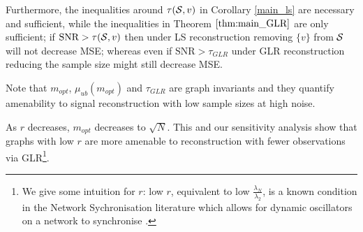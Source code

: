 {\begin{remark}
    Furthermore, the inequalities around $\tau(\mathcal{S},v)$ in Corollary \ref{main_ls} are necessary and sufficient, while the inequalities in Theorem $\ref{thm:main_GLR}$ are only sufficient; if $\textrm{SNR} > \tau(\mathcal{S},v)$ then under LS reconstruction removing $\{v\}$ from $\mathcal{S}$ will not decrease MSE; whereas even if $\textrm{SNR} > \tau_{GLR}$ under GLR reconstruction reducing the sample size might still decrease MSE.
\end{remark}
\fi

Note that $m_{opt}$, $\mu_{ub}(m_{opt})$ and $\tau_{GLR}$ are graph invariants and they quantify amenability to signal reconstruction with low sample sizes at high noise. 

As $r$ decreases, $m_{opt}$ decreases to $\sqrt{N}$. This and our sensitivity analysis show that graphs with low $r$ are more amenable to reconstruction with fewer observations via GLR\footnote{We give some intuition for $r$: low $r$, equivalent to low $\frac{\lambda_{N}}{\lambda_{2}}$, is a known condition in the Network Sychronisation literature which allows for dynamic oscillators on a network to synchronise \cite{barahona2002synchronization}.}. %
\fi

}
